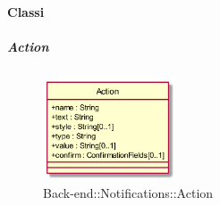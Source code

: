 \paragraph{Classi}
\hypertarget{Action_label}{\subparagraph{Action}}
\begin{figure}[h]
	\centering
	\includegraphics[width=0.35\textwidth,height=\textheight,keepaspectratio]{images/ClassAction.png}
	\caption{Back-end::Notifications::Action}
\end{figure}
